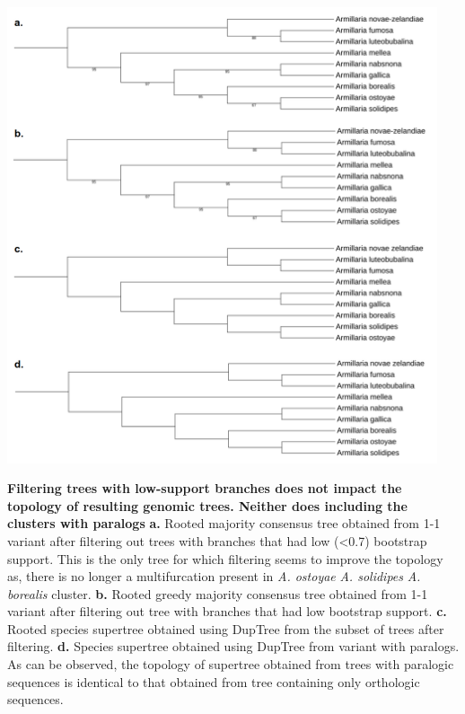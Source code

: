\documentclass[two column, twoside, a4paper]{article}
\begin{document}
\begin{suppfigure*}
  \begin{center}
    \includegraphics[width=0.95\textwidth]{figures/Figure_3.png}
  \end{center}
  \caption{\sf \textbf{Filtering trees with low-support branches does not impact the topology of resulting genomic trees. Neither does including the clusters with paralogs} \textbf{a.} Rooted majority consensus tree obtained from 1-1 variant after filtering out trees with branches that had low (<0.7) bootstrap support. This is the only tree for which filtering seems to improve the topology as, there is no longer a multifurcation present in \textit{A. ostoyae} \textit{A. solidipes} \textit{A. borealis} cluster. \textbf{b.} Rooted greedy majority consensus tree obtained from 1-1 variant after filtering out tree with branches that had low bootstrap support. \textbf{c.} Rooted species supertree obtained using DupTree from the subset of trees after filtering. \textbf{d.} Species supertree obtained using DupTree from variant with paralogs. As can be observed, the topology of supertree obtained from trees with paralogic sequences is identical to that obtained from tree containing only orthologic sequences.} 
  \label{fig:filtered_trees}
\end{suppfigure*}
\end{document}
